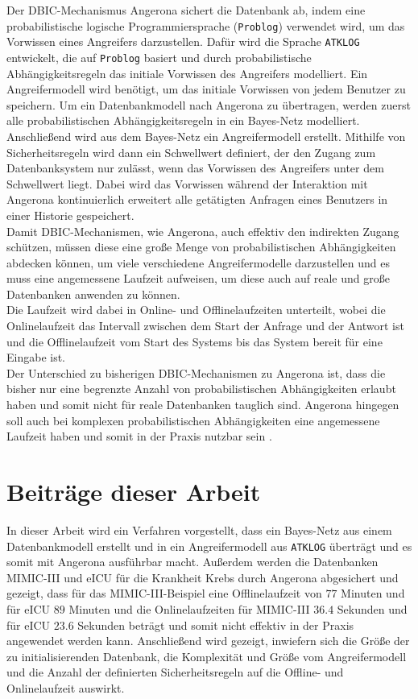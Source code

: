 \documentclass[german,version-2020-11]{uzl-thesis}
\begin{document}
Der DBIC-Mechanismus Angerona sichert die Datenbank ab, indem eine probabilistische logische Programmiersprache (\texttt{Problog}) verwendet wird, um das Vorwissen eines Angreifers darzustellen. Dafür wird die Sprache \texttt{ATKLOG} entwickelt, die auf \texttt{Problog} basiert und durch probabilistische Abhängigkeitsregeln das initiale Vorwissen des Angreifers modelliert. Ein Angreifermodell wird benötigt, um das initiale Vorwissen von jedem Benutzer zu speichern.  Um ein Datenbankmodell nach Angerona zu übertragen, werden zuerst alle probabilistischen Abhängigkeitsregeln in ein Bayes-Netz modelliert. Anschließend wird aus dem Bayes-Netz ein Angreifermodell erstellt. Mithilfe von Sicherheitsregeln wird dann ein Schwellwert definiert, der den Zugang zum Datenbanksystem nur zulässt, wenn das Vorwissen des Angreifers unter dem Schwellwert liegt. Dabei wird das Vorwissen während der Interaktion mit Angerona kontinuierlich erweitert alle getätigten Anfragen eines Benutzers in einer Historie gespeichert. \\  
Damit DBIC-Mechanismen, wie Angerona, auch effektiv den indirekten Zugang schützen, müssen diese eine große Menge von probabilistischen Abhängigkeiten abdecken können, um viele verschiedene Angreifermodelle darzustellen und es muss eine angemessene Laufzeit aufweisen, um diese auch auf reale und große Datenbanken anwenden zu können.\\
Die Laufzeit wird dabei in Online- und Offlinelaufzeiten unterteilt, wobei die Onlinelaufzeit  das Intervall zwischen dem Start der Anfrage und der Antwort ist und die Offlinelaufzeit  vom Start des Systems bis das System bereit für eine Eingabe ist. \\
Der Unterschied zu bisherigen DBIC-Mechanismen zu Angerona ist, dass die bisher nur eine begrenzte Anzahl von probabilistischen Abhängigkeiten erlaubt haben und somit nicht für reale Datenbanken tauglich sind. Angerona hingegen soll auch bei komplexen probabilistischen Abhängigkeiten eine angemessene Laufzeit haben und somit in der Praxis nutzbar sein \cite{guarnieri2017securing}. \\

\section{Beiträge dieser Arbeit}
In dieser Arbeit wird ein Verfahren vorgestellt, dass ein Bayes-Netz aus einem Datenbankmodell erstellt und in ein Angreifermodell aus \texttt{ATKLOG} überträgt und es somit mit Angerona ausführbar macht. Außerdem werden die Datenbanken MIMIC-III und eICU für die Krankheit Krebs durch Angerona abgesichert und gezeigt, dass für das MIMIC-III-Beispiel eine Offlinelaufzeit von $77$ Minuten und für eICU $89$ Minuten und die Onlinelaufzeiten für MIMIC-III $36.4$ Sekunden und für eICU $23.6$ Sekunden beträgt und somit nicht effektiv in der Praxis angewendet werden kann. Anschließend wird gezeigt, inwiefern sich die Größe der zu initialisierenden Datenbank, die Komplexität und Größe vom Angreifermodell und die Anzahl der definierten Sicherheitsregeln auf die Offline- und Onlinelaufzeit auswirkt.
\end{document}
